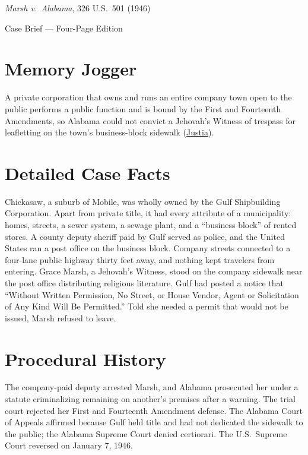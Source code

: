 \documentclass[12pt]{article}
\begin{document}
\begin{center}
{\LARGE \textit{Marsh v.\ Alabama}, 326 U.S.\ 501 (1946)\par}
\vspace{0.8em}
{\large Case Brief --- Four-Page Edition\par}
\end{center}
\vspace{1em}

\section{Memory Jogger}

A private corporation that owns and runs an entire company town open to the public performs a public function and is bound by the First and Fourteenth Amendments, so Alabama could not convict a Jehovah's Witness of trespass for leafletting on the town's business-block sidewalk (\href{https://supreme.justia.com/cases/federal/us/326/501/}{Justia}).

\section{Detailed Case Facts}

Chickasaw, a suburb of Mobile, was wholly owned by the Gulf Shipbuilding Corporation. Apart from private title, it had every attribute of a municipality: homes, streets, a sewer system, a sewage plant, and a ``business block'' of rented stores. A county deputy sheriff paid by Gulf served as police, and the United States ran a post office on the business block. Company streets connected to a four-lane public highway thirty feet away, and nothing kept travelers from entering. Grace Marsh, a Jehovah's Witness, stood on the company sidewalk near the post office distributing religious literature. Gulf had posted a notice that ``Without Written Permission, No Street, or House Vendor, Agent or Solicitation of Any Kind Will Be Permitted.'' Told she needed a permit that would not be issued, Marsh refused to leave.

\section{Procedural History}

The company-paid deputy arrested Marsh, and Alabama prosecuted her under a statute criminalizing remaining on another's premises after a warning. The trial court rejected her First and Fourteenth Amendment defense. The Alabama Court of Appeals affirmed because Gulf held title and had not dedicated the sidewalk to the public; the Alabama Supreme Court denied certiorari. The U.S.\ Supreme Court reversed on January 7, 1946.
\end{document}
